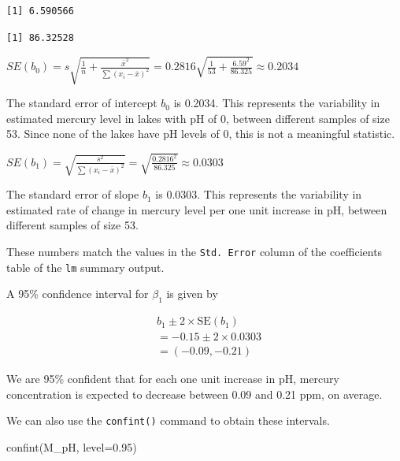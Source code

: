 \documentclass[
  letterpaper,
  DIV=11,
  numbers=noendperiod]{scrreprt}
\newenvironment{Shaded}{\begin{snugshade}}{\end{snugshade}}
\newcommand{\AttributeTok}[1]{\textcolor[rgb]{0.40,0.45,0.13}{#1}}
\newcommand{\DecValTok}[1]{\textcolor[rgb]{0.68,0.00,0.00}{#1}}
\newcommand{\FloatTok}[1]{\textcolor[rgb]{0.68,0.00,0.00}{#1}}
\newcommand{\FunctionTok}[1]{\textcolor[rgb]{0.28,0.35,0.67}{#1}}
\newcommand{\NormalTok}[1]{\textcolor[rgb]{0.00,0.23,0.31}{#1}}
\newcommand{\OtherTok}[1]{\textcolor[rgb]{0.00,0.23,0.31}{#1}}
\newcommand{\SpecialCharTok}[1]{\textcolor[rgb]{0.37,0.37,0.37}{#1}}
\begin{document}
\begin{verbatim}
[1] 6.590566
\end{verbatim}

\begin{Shaded}
\end{Shaded}

\begin{verbatim}
[1] 86.32528
\end{verbatim}

\(SE(b_0)=s\sqrt{\frac{1}{n}+\frac{\bar{x}^2}{\sum(x_i-\bar{x})^2}} = 0.2816\sqrt{\frac{1}{53}+\frac{6.59^2}{86.325}}\approx 0.2034\)

The standard error of intercept \(b_0\) is 0.2034. This represents the
variability in estimated mercury level in lakes with pH of 0, between
different samples of size 53. Since none of the lakes have pH levels of
0, this is not a meaningful statistic.

\(SE(b_1)=\sqrt{\frac{s^2}{\sum(x_i-\bar{x})^2}}=\sqrt{\frac{0.2816^2}{86.325}} \approx 0.0303\)

The standard error of slope \(b_1\) is 0.0303. This represents the
variability in estimated rate of change in mercury level per one unit
increase in pH, between different samples of size 53.

These numbers match the values in the \texttt{Std.\ Error} column of the
coefficients table of the \texttt{lm} summary output.

A 95\% confidence interval for \(\beta_1\) is given by

\[
\begin{aligned}
& b_1 \pm 2\times\text{SE}(b_1) \\
& = -0.15 \pm 2\times{0.0303} \\
& = (-0.09, -0.21)
\end{aligned}
\]

We are 95\% confident that for each one unit increase in pH, mercury
concentration is expected to decrease between 0.09 and 0.21 ppm, on
average.

We can also use the \texttt{confint()} command to obtain these
intervals.

\begin{Shaded}
\begin{Highlighting}[]
\FunctionTok{confint}\NormalTok{(M\_pH, }\AttributeTok{level=}\FloatTok{0.95}\NormalTok{)}
\end{Highlighting}
\end{Shaded}
\end{document}
